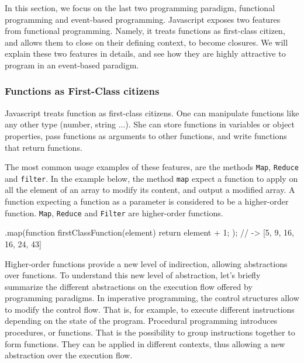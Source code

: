 In this section, we focus on the last two programming paradigm, functional programming and event-based programming.
Javascript exposes two features from functional programming.
Namely, it treats functions as first-class citizen, and allows them to close on their defining context, to become closures.
We will explain these two features in details, and see how they are highly attractive to program in an event-based paradigm.

\subsubsection{Functions as First-Class citizens}


Javascript treats function as first-class citizens.
One can manipulate functions like any other type (number, string ...).
She can store functions in variables or object properties, pass functions as arguments to other functions, and write functions that return functions.

The most common usage examples of these features, are the methods \texttt{Map}, \texttt{Reduce} and \texttt{filter}.
In the example below, the method \texttt{map} expect a function to apply on all the element of an array to modify its content, and output a modified array.
A function expecting a function as a parameter is considered to be a higher-order function. \texttt{Map}, \texttt{Reduce} and \texttt{Filter} are higher-order functions.

\begin{code}
  [4, 8, 15, 16, 23, 42].map(function firstClassFunction(element) {
    return element + 1;
  });
  // -> [5, 9, 16, 16, 24, 43]
\end{code}

Higher-order functions provide a new level of indirection, allowing abstractions over functions.
To understand this new level of abstraction, let's briefly summarize the different abstractions on the execution flow offered by programming paradigms.
In imperative programming, the control structures allow to modify the control flow. That is, for example, to execute different instructions depending on the state of the program.
Procedural programming introduces procedures, or functions. That is the possibility to group instructions together to form functions.
They can be applied in different contexts, thus allowing a new abstraction over the execution flow.

